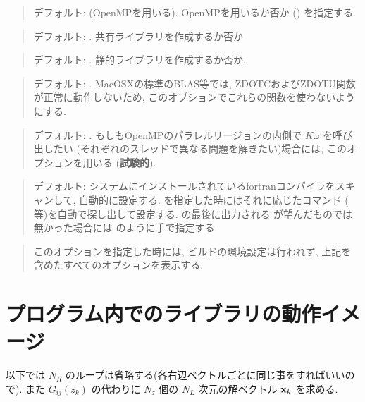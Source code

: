 \documentclass[letterpaper,10pt,dvipdfmx,openany]{sphinxmanual}
\begin{document}
\begin{quote}

デフォルト:  (OpenMPを用いる).
OpenMPを用いるか否か () を指定する.
\end{quote}

\begin{quote}

デフォルト: .
共有ライブラリを作成するか否か
\end{quote}

\begin{quote}

デフォルト: .
静的ライブラリを作成するか否か.
\end{quote}

\begin{quote}

デフォルト: .
MacOSXの標準のBLAS等では, ZDOTCおよびZDOTU関数が正常に動作しないため,
このオプションでこれらの関数を使わないようにする.
\end{quote}

\begin{quote}

デフォルト: .
もしもOpenMPのパラレルリージョンの内側で \(K\omega\) を呼び出したい
(それぞれのスレッドで異なる問題を解きたい)場合には,
このオプションを用いる (\textbf{試験的}).
\end{quote}

\begin{quote}

デフォルト: システムにインストールされているfortranコンパイラをスキャンして,
自動的に設定する.  を指定した時にはそれに応じたコマンド
( 等)を自動で探し出して設定する.
 の最後に出力される  が望んだものでは無かった場合には
 のように手で指定する.
\end{quote}

\begin{quote}

このオプションを指定した時には, ビルドの環境設定は行われず,
上記を含めたすべてのオプションを表示する.
\end{quote}


\chapter{プログラム内でのライブラリの動作イメージ}
\label{komega_workflow_ja::doc}\label{komega_workflow_ja:id1}
以下では \(N_R\) のループは省略する(各右辺ベクトルごとに同じ事をすればいいので).
また \(G_{i j}(z_k)\) の代わりに \(N_z\) 個の \(N_L\) 次元の解ベクトル \({\bf x}_{k}\) を求める.
\end{document}
